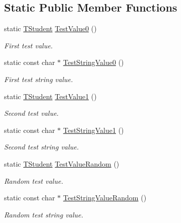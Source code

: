 \subsection*{Static Public Member Functions}
\begin{DoxyCompactItemize}
\item 
static \hyperlink{struct_c_value___t_student_1_1_t_student}{T\+Student} \hyperlink{class_c_value___t_student_1_1_c_value_a7e1c9e64ef5c8428df0fd56772d1240e}{Test\+Value0} ()
\begin{DoxyCompactList}\small\item\em First test value. \end{DoxyCompactList}\item 
static const char $\ast$ \hyperlink{class_c_value___t_student_1_1_c_value_a7a3fba914631fd789942450660718a32}{Test\+String\+Value0} ()
\begin{DoxyCompactList}\small\item\em First test string value. \end{DoxyCompactList}\item 
static \hyperlink{struct_c_value___t_student_1_1_t_student}{T\+Student} \hyperlink{class_c_value___t_student_1_1_c_value_a41c8aac60fd9651de611ce2220d3f352}{Test\+Value1} ()
\begin{DoxyCompactList}\small\item\em Second test value. \end{DoxyCompactList}\item 
static const char $\ast$ \hyperlink{class_c_value___t_student_1_1_c_value_a0454785a06a1974c4b969d7684b46f2b}{Test\+String\+Value1} ()
\begin{DoxyCompactList}\small\item\em Second test string value. \end{DoxyCompactList}\item 
static \hyperlink{struct_c_value___t_student_1_1_t_student}{T\+Student} \hyperlink{class_c_value___t_student_1_1_c_value_a86cd62d595805bfaaa99c7519fddff21}{Test\+Value\+Random} ()
\begin{DoxyCompactList}\small\item\em Random test value. \end{DoxyCompactList}\item 
static const char $\ast$ \hyperlink{class_c_value___t_student_1_1_c_value_af49bae0a3cb30d58c8528e168693558b}{Test\+String\+Value\+Random} ()
\begin{DoxyCompactList}\small\item\em Random test string value. \end{DoxyCompactList}\end{DoxyCompactItemize}
